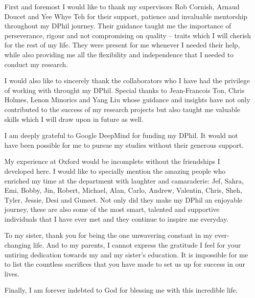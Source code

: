 First and foremost I would like to thank my supervisors Rob Cornish, Arnaud Doucet and Yee Whye Teh 
for their support, patience and invaluable mentorship throughout my DPhil journey. 
Their guidance taught me the importance of perseverance, rigour and not compromising on quality -- 
traits which I will cherish for the rest of my life.
They were present for me whenever I needed their help, while also providing me all the flexibility and independence that I needed to conduct my research. 

I would also like to sincerely thank the collaborators who I have had the privilege of working with throught my DPhil. 
Special thanks to Jean-Francois Ton, Chris Holmes, Lenon Minorics and Yang Liu whose guidance and insights have not only contributed to the success of my research projects but also taught me valuable skills which I will draw upon in future as well.

I am deeply grateful to Google DeepMind for funding my DPhil. 
It would not have been possible for me to pursue my studies without their generous support.

My experience at Oxford would be incomplete without the friendships I developed here. 
I would like to specially mention the amazing people who enriched my time at the department with laughter and camaraderie: Jef, Sahra, Emi, Bobby, Jin, Robert, Michael, Alan, Carlo, Andrew, Valentin, Chris, Sheh, Tyler, Jessie, Desi and Guneet.  
Not only did they make my DPhil an enjoyable journey, these are also some of the most smart, talented and supportive individuals that I have ever met and they continue to inspire me everyday. 

To my sister, thank you for being the one unwavering constant in my ever-changing life. 
And to my parents, I cannot express the gratitude I feel for your untiring dedication towards my and my sister's education.
It is impossible for me to list the countless sacrifices that you have made to set us up for success in our lives. 

Finally, I am forever indebted to God for blessing me with this incredible life.